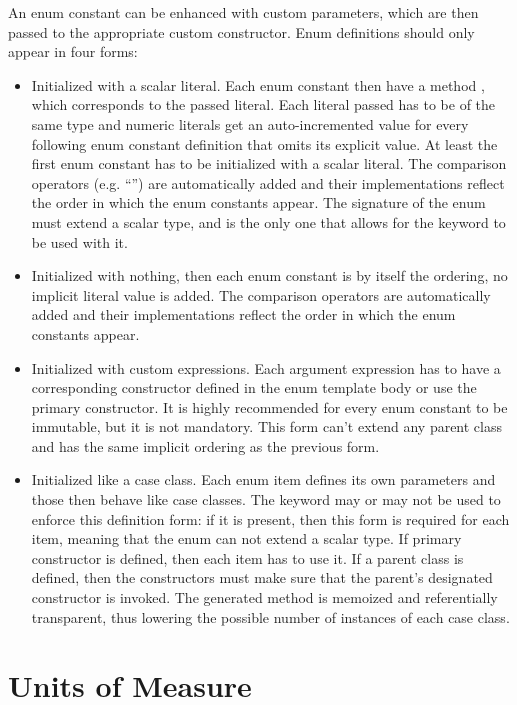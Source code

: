 An enum constant can be enhanced with custom parameters, which are then passed to the appropriate custom constructor. Enum definitions should only appear in four forms: 
\begin{itemize}
  \item Initialized with a scalar literal. Each enum constant then have a method , which corresponds to the passed literal. Each literal passed has to be of the same type and numeric literals get an auto-incremented value for every following enum constant definition that omits its explicit value. At least the first enum constant has to be initialized with a scalar literal. The comparison operators (e.g. ``\code{<}'') are automatically added and their implementations reflect the order in which the enum constants appear. The signature of the enum must extend a scalar type, and is the only one that allows for the  keyword to be used with it.
  \item Initialized with nothing, then each enum constant is by itself the ordering, no implicit literal value is added. The comparison operators are automatically added and their implementations reflect the order in which the enum constants appear. 
  \item Initialized with custom expressions. Each argument expression has to have a corresponding constructor defined in the enum template body or use the primary constructor. It is highly recommended for every enum constant to be immutable, but it is not mandatory. This form can't extend any parent class and has the same implicit ordering as the previous form. 
  \item Initialized like a case class. Each enum item defines its own parameters and those then behave like case classes. The  keyword may or may not be used to enforce this definition form: if it is present, then this form is required for each item, meaning that the enum can not extend a scalar type. If primary constructor is defined, then each item has to use it. If a parent class is defined, then the constructors must make sure that the parent's designated constructor is invoked. The generated  method is memoized and referentially transparent, thus lowering the possible number of instances of each case class. 
\end{itemize}





\section{Units of Measure}
\label{sec:units-of-measure}

